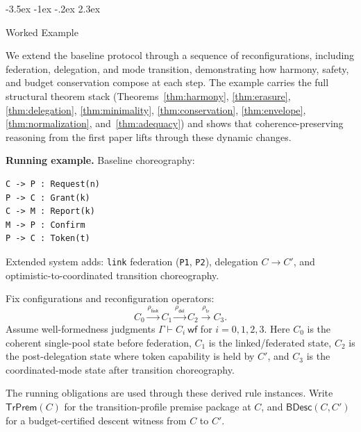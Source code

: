 \documentclass[a4paper,10pt,twocolumn,english]{article}
\makeatletter
\renewcommand{\section}{\@startsection{section}{1}{\z@}%
  {-3.5ex \@plus -1ex \@minus -.2ex}%
  {2.3ex}%
  {\raggedright\normalfont\large\bfseries}}
\numberwithin{equation}{section}
\theoremstyle{paperdef}
\theoremstyle{paperplain}
\theoremstyle{paperdef}
\theoremstyle{paperremark}
\theoremstyle{paperdef}
\newcommand{\wf}{\ensuremath{\mathsf{wf}}}
\newcommand{\ABHStack}{Theorems~\ref{thm:harmony}, \ref{thm:erasure}, \ref{thm:delegation}, \ref{thm:minimality}, \ref{thm:conservation}, \ref{thm:envelope}, \ref{thm:normalization}, and~\ref{thm:adequacy}}
\makeatother
\begin{document}
\section{Worked Example}
\label{sec:example}

We extend the baseline protocol through a sequence of reconfigurations, including federation, delegation, and mode transition, demonstrating how harmony, safety, and budget conservation compose at each step. The example carries the full structural theorem stack (\ABHStack) and shows that coherence-preserving reasoning from the first paper lifts through these dynamic changes.

\noindent\begingroup\raggedright
\textbf{Running example.} Baseline choreography:
\par\endgroup

\noindent\begin{minipage}{\columnwidth}
	\begin{lstlisting}
C -> P : Request(n)
P -> C : Grant(k)
C -> M : Report(k)
M -> P : Confirm
P -> C : Token(t)
\end{lstlisting}
\end{minipage}

Extended system adds: \texttt{link} federation (\texttt{P1}, \texttt{P2}),
delegation $C \to C'$, and optimistic-to-coordinated transition choreography.

Fix configurations and reconfiguration operators:
\begin{equation}
	C_0 \xrightarrow{\rho_{\mathsf{link}}} C_1 \xrightarrow{\rho_{\mathsf{del}}}
	C_2 \xrightarrow{\rho_{\mathsf{tr}}} C_3.
\end{equation}
Assume well-formedness judgments $\Gamma \vdash C_i\ \wf$ for $i=0,1,2,3$. Here $C_0$ is the coherent single-pool state before federation, $C_1$ is the linked/federated state, $C_2$ is the post-delegation state where token capability is held by $C'$, and $C_3$ is the coordinated-mode state after transition choreography.

The running obligations are used through these derived rule instances.
Write $\mathsf{TrPrem}(C)$ for the transition-profile premise package at $C$, and
$\mathsf{BDesc}(C,C')$ for a budget-certified descent witness from $C$ to $C'$.
\end{document}
